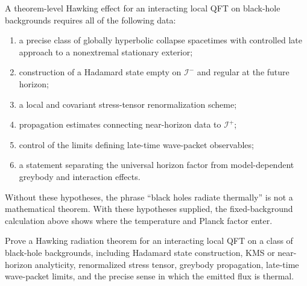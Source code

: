 A theorem-level Hawking effect for an interacting local QFT on black-hole
backgrounds requires all of the following data:
\begin{enumerate}[label=(\roman*)]
\item a precise class of globally hyperbolic collapse spacetimes with
  controlled late approach to a nonextremal stationary exterior;
\item construction of a Hadamard state empty on \(\mathcal I^-\) and regular
  at the future horizon;
\item a local and covariant stress-tensor renormalization scheme;
\item propagation estimates connecting near-horizon data to \(\mathcal I^+\);
\item control of the limits defining late-time wave-packet observables;
\item a statement separating the universal horizon factor from
  model-dependent greybody and interaction effects.
\end{enumerate}
Without these hypotheses, the phrase ``black holes radiate thermally'' is not
a mathematical theorem.  With these hypotheses supplied, the fixed-background
calculation above shows where the temperature and Planck factor enter.

\begin{openproblem}
\label{op:interacting-hawking-theorem}
Prove a Hawking radiation theorem for an interacting local QFT on a class of
black-hole backgrounds, including Hadamard state construction, KMS or
near-horizon analyticity, renormalized stress tensor, greybody propagation,
late-time wave-packet limits, and the precise sense in which the emitted
flux is thermal.
\end{openproblem}

